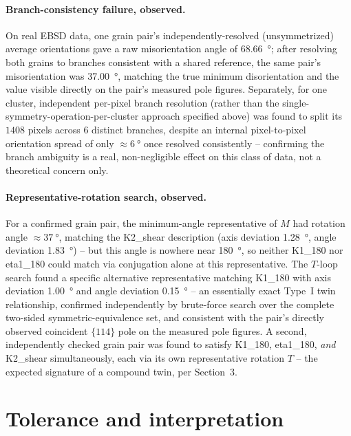 \documentclass[11pt]{article}
\begin{document}
\paragraph{Branch-consistency failure, observed.} On real EBSD data, one
grain pair's independently-resolved (unsymmetrized) average orientations
gave a raw misorientation angle of \SI{68.66}{\degree}; after resolving
both grains to branches consistent with a shared reference, the same
pair's misorientation was \SI{37.00}{\degree}, matching the true minimum
disorientation and the value visible directly on the pair's measured
pole figures. Separately, for one cluster, independent per-pixel branch
resolution (rather than the single-symmetry-operation-per-cluster
approach specified above) was found to split its $1408$ pixels across
$6$ distinct branches, despite an internal pixel-to-pixel orientation
spread of only $\approx\SI{6}{\degree}$ once resolved consistently --
confirming the branch ambiguity is a real, non-negligible effect on this
class of data, not a theoretical concern only.

\paragraph{Representative-rotation search, observed.} For a confirmed
grain pair, the minimum-angle representative of $M$ had rotation angle
$\approx\SI{37}{\degree}$, matching the K2\_shear description (axis
deviation \SI{1.28}{\degree}, angle deviation \SI{1.83}{\degree}) -- but
this angle is nowhere near \SI{180}{\degree}, so neither K1\_180 nor
eta1\_180 could match via conjugation alone at this representative. The
$T$-loop search found a specific alternative representative matching
K1\_180 with axis deviation \SI{1.00}{\degree} and angle deviation
\SI{0.15}{\degree} -- an essentially exact Type~I twin relationship,
confirmed independently by brute-force search over the complete
two-sided symmetric-equivalence set, and consistent with the pair's
directly observed coincident $\{114\}$ pole on the measured pole
figures. A second, independently checked grain pair was found to satisfy
K1\_180, eta1\_180, \emph{and} K2\_shear simultaneously, each via its own
representative rotation $T$ -- the expected signature of a compound
twin, per Section~3.

\section{Tolerance and interpretation}
\end{document}

